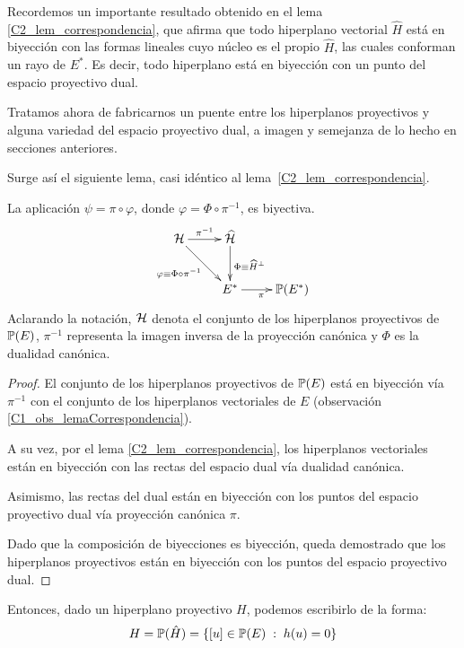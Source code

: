 Recordemos un importante resultado obtenido en el lema \ref{C2_lem_correspondencia}, que afirma que todo hiperplano  vectorial $\widehat{H}$ está en biyección con las formas lineales cuyo núcleo es el propio $\widehat{H}$, las cuales conforman un rayo de $E^*$. Es decir, todo hiperplano está en biyección con un punto del espacio proyectivo dual.

Tratamos ahora de fabricarnos un puente entre los hiperplanos proyectivos y alguna variedad del espacio proyectivo dual, a imagen y semejanza de lo hecho en secciones anteriores.

Surge así el siguiente lema, casi idéntico al lema~\ref{C2_lem_correspondencia}.
\begin{lem}
	\label{C2_lem_correspondenciaProy}
	La aplicación $\psi=\pi\circ\varphi$, donde $\varphi=\Phi\circ \pi^{-1}$, es biyectiva.
	\begin{equation*}
		\xymatrix{
			\mc{H} \ar[r]^{\pi^{-1}} \ar[rd]_{\varphi\equiv\Phi\circ\pi^{-1}} & \widehat{\mc{H}}\ar[d]^{\Phi\equiv\widehat{H}^{\perp}}\\
			 & E^* \ar[r]_{\pi} & \proy(E^*)
		}
	\end{equation*}
	Aclarando la notación, $\mathcal{H}$ denota el conjunto de los hiperplanos proyectivos de $\mathbb{P}(E)$, $\pi^{-1}$ representa la imagen inversa de la proyección canónica y $\Phi$ es la dualidad canónica.
\end{lem}
\begin{proof}
	El conjunto de los hiperplanos proyectivos de $\mathbb{P}(E)$ está en biyección vía $\pi^{-1}$ con el conjunto de los hiperplanos vectoriales de $E$ (observación \ref{C1_obs_lemaCorrespondencia}).
	
	A su vez, por el lema \ref{C2_lem_correspondencia}, los hiperplanos vectoriales están en biyección con las rectas del espacio dual vía dualidad canónica.
	
	Asimismo, las rectas del dual están en biyección con los puntos del espacio proyectivo dual vía proyección canónica $\pi$.
	
	Dado que la composición de biyecciones es biyección, queda demostrado que los hiperplanos proyectivos están en biyección con los puntos del espacio proyectivo dual.
\end{proof}
Entonces, dado un hiperplano proyectivo $H$, podemos escribirlo de la forma:
\begin{equation}
H=\mathbb{P}(\hat{H})=\{[u]\in\mathbb{P}(E)\;:\; h(u)=0\}
\end{equation}

